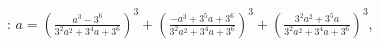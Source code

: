 \documentclass[preview]{standalone}
\begin{document}
\begin{center}
: $a = \left( \frac{a^3 - 3^6}{3^2a^2 + 3^4a + 3^6} \right)^3 + \left( \frac{-a^3 + 3^5a + 3^6}{3^2a^2 + 3^4a + 3^6} \right)^3 + \left( \frac{3^2a^2 + 3^5a}{3^2a^2 + 3^4a + 3^6} \right)^3$,
\end{center}
\end{document}
